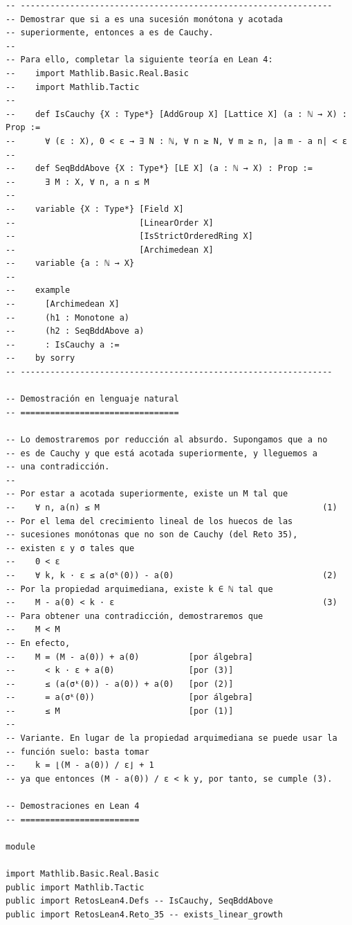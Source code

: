 \begin{verbatim}
-- ---------------------------------------------------------------
-- Demostrar que si a es una sucesión monótona y acotada
-- superiormente, entonces a es de Cauchy.
--
-- Para ello, completar la siguiente teoría en Lean 4:
--    import Mathlib.Basic.Real.Basic
--    import Mathlib.Tactic
--
--    def IsCauchy {X : Type*} [AddGroup X] [Lattice X] (a : ℕ → X) : Prop :=
--      ∀ (ε : X), 0 < ε → ∃ N : ℕ, ∀ n ≥ N, ∀ m ≥ n, |a m - a n| < ε
--
--    def SeqBddAbove {X : Type*} [LE X] (a : ℕ → X) : Prop :=
--      ∃ M : X, ∀ n, a n ≤ M
--
--    variable {X : Type*} [Field X]
--                         [LinearOrder X]
--                         [IsStrictOrderedRing X]
--                         [Archimedean X]
--    variable {a : ℕ → X}
--
--    example
--      [Archimedean X]
--      (h1 : Monotone a)
--      (h2 : SeqBddAbove a)
--      : IsCauchy a :=
--    by sorry
-- ---------------------------------------------------------------

-- Demostración en lenguaje natural
-- ================================

-- Lo demostraremos por reducción al absurdo. Supongamos que a no
-- es de Cauchy y que está acotada superiormente, y lleguemos a
-- una contradicción.
--
-- Por estar a acotada superiormente, existe un M tal que
--    ∀ n, a(n) ≤ M                                             (1)
-- Por el lema del crecimiento lineal de los huecos de las
-- sucesiones monótonas que no son de Cauchy (del Reto 35),
-- existen ε y σ tales que
--    0 < ε
--    ∀ k, k · ε ≤ a(σᵏ(0)) - a(0)                              (2)
-- Por la propiedad arquimediana, existe k ∈ ℕ tal que
--    M - a(0) < k · ε                                          (3)
-- Para obtener una contradicción, demostraremos que
--    M < M
-- En efecto,
--    M = (M - a(0)) + a(0)          [por álgebra]
--      < k · ε + a(0)               [por (3)]
--      ≤ (a(σᵏ(0)) - a(0)) + a(0)   [por (2)]
--      = a(σᵏ(0))                   [por álgebra]
--      ≤ M                          [por (1)]
--
-- Variante. En lugar de la propiedad arquimediana se puede usar la
-- función suelo: basta tomar
--    k = ⌊(M - a(0)) / ε⌋ + 1
-- ya que entonces (M - a(0)) / ε < k y, por tanto, se cumple (3).

-- Demostraciones en Lean 4
-- ========================

module

import Mathlib.Basic.Real.Basic
public import Mathlib.Tactic
public import RetosLean4.Defs -- IsCauchy, SeqBddAbove
public import RetosLean4.Reto_35 -- exists_linear_growth


\end{verbatim}
